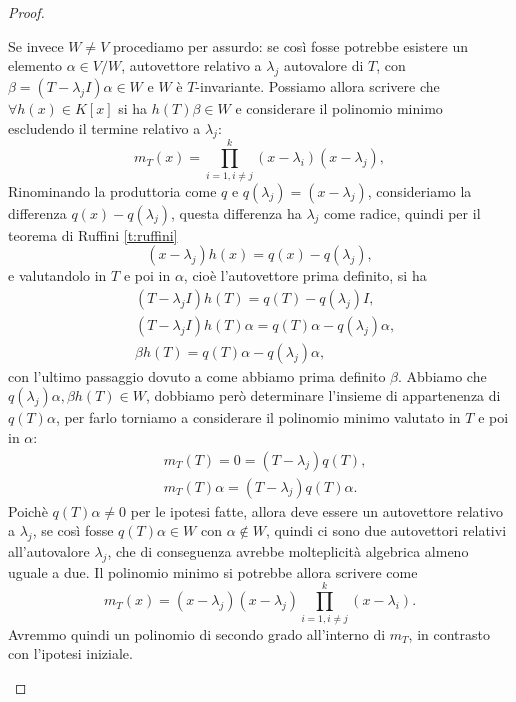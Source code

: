 \begin{proof}
\begin{itemize}
			Se invece $W\neq V$ procediamo per assurdo: se così fosse potrebbe esistere un elemento $\alpha\in V/W$, autovettore relativo a $\lambda_j$ autovalore di $T$, con $\beta = (T-\lambda_j I)\alpha\in W$ e $W$ è $T$-invariante.
			Possiamo allora scrivere che $\forall h(x)\in K[x]$ si ha $h(T)\beta\in W$ e considerare il polinomio minimo escludendo il termine relativo a $\lambda_j$:
			\begin{equation*}
				m_T(x) = \prod\limits_{i=1 , i\neq j}^k(x-\lambda_i)(x-\lambda_j),
			\end{equation*}
			Rinominando la produttoria come $q$ e $q(\lambda_j) =(x-\lambda_j)$, consideriamo la differenza $q(x)-q(\lambda_j)$, questa differenza ha $\lambda_j$ come radice, quindi per il teorema di Ruffini \ref{t:ruffini}
			\begin{equation*}
				(x-\lambda_j)h(x) = q(x) - q(\lambda_j),
			\end{equation*}
			e valutandolo in $T$ e poi in $\alpha$, cioè l'autovettore prima definito, si ha
			\begin{equation*}
				\begin{aligned}
					&(T-\lambda_j I) h(T) = q(T) -q(\lambda_j)I,\\
					&(T-\lambda_j I) h(T) \alpha = q(T) \alpha -q(\lambda_j) \alpha,\\
					& \beta h(T) =  q(T) \alpha -q(\lambda_j) \alpha,
				\end{aligned}
			\end{equation*}
			con l'ultimo passaggio dovuto a come abbiamo prima definito $\beta$.
			Abbiamo che  $q(\lambda_j) \alpha, \beta h(T)\in W$, dobbiamo però determinare l'insieme di appartenenza di $q(T) \alpha$, per farlo torniamo a considerare il polinomio minimo valutato in $T$ e poi in $\alpha$:
			\begin{equation*}
				\begin{aligned}
					&m_T(T) = 0 = (T-\lambda_j)q(T),\\
					&m_T(T)\alpha =  (T-\lambda_j)q(T)\alpha.
				\end{aligned}
			\end{equation*}
			Poichè $q(T)\alpha \neq 0$ per le ipotesi fatte, allora deve essere un autovettore relativo a $\lambda_j$, se così fosse $q(T)\alpha\in W$ con $\alpha\notin W$, quindi ci sono due autovettori relativi all'autovalore $\lambda_j$, che di conseguenza avrebbe molteplicità algebrica almeno uguale a due.
			Il polinomio minimo si potrebbe allora scrivere come
			\begin{equation*}
				m_T(x) = (x-\lambda_j)(x-\lambda_j) \prod\limits_{i=1 , i\neq j}^k(x-\lambda_i).
			\end{equation*}
			Avremmo quindi un polinomio di secondo grado all'interno di $m_T$, in contrasto con l'ipotesi iniziale.
	\end{itemize}
\end{proof}


